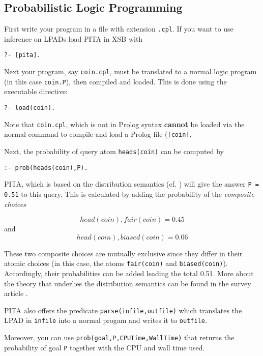 \subsection{Probabilistic Logic Programming}
First write your program in a file with extension \texttt{.cpl}.
If you want to use inference on LPADs load PITA in XSB with
\begin{verbatim}
?- [pita].
\end{verbatim}
Next your program, say \texttt{coin.cpl}, must be translated to a
normal logic program (in this case {\tt coin.P}), then compiled and
loaded.  This is done using the executable directive:
\begin{verbatim}
?- load(coin).
\end{verbatim}
Note that {\tt coin.cpl}, which is not in Prolog syntax {\bf cannot}
be loaded via the normal command to compile and load a Prolog file
({\tt [coin]}.

Next, the probability of query atom \texttt{heads(coin)} can be
computed by
\begin{verbatim}
:- prob(heads(coin),P).
\end{verbatim} 
%
PITA, which is based on the distribution semantics
(cf. \cite{Sato95astatistical}) will give the answer {\tt P = 0.51} to
this query.  This is calculated by adding the probability of the
{\em composite choices}

\[ head(coin),fair(coin) = 0.45 \]
and 
\[ head(coin),biased(coin) = 0.06\]

These two composite choices are mutually exclusive since they differ
in their atomic choices (in this case, the atoms {\tt fair(coin)} and
{\tt biased(coin)}).  Accordingly, their probabilities can be added
leading the total 0.51.  More about the theory that underlies the
distribution semantics can be found in the survey article
\cite{RigS15}.

PITA also offers the predicate \texttt{parse(infile,outfile)} which
translates the LPAD in \texttt{infile} into a normal progam and writes
it to \texttt{outfile}.

Moreover, you can use \texttt{prob(goal,P,CPUTime,WallTime)} that
returns the probability of goal \texttt{P} together with the CPU and
wall time used.

